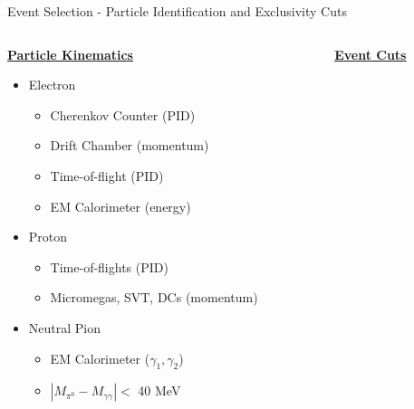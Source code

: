 \documentclass[aspectratio=169]{beamer}
\begin{document}
\begin{frame}{Event Selection - Particle Identification and Exclusivity Cuts}

        
        \begin{columns}[c]
           \begin{column}{0.35\textwidth}
            \centering \textbf{\underline{Particle Kinematics}}
                \begin{itemize}
                    \item Electron
                        \begin{itemize}
                            \item Cherenkov Counter (PID)
                            \item Drift Chamber (momentum)
                            \item Time-of-flight (PID)
                            \item EM Calorimeter (energy)
                        \end{itemize}
                    \item Proton
                        \begin{itemize}
                            \item Time-of-flights (PID)
                            \item Micromegas, SVT, DCs (momentum)
                        \end{itemize}
                    \item Neutral Pion
                        \begin{itemize}
                            \item EM Calorimeter ($\gamma_1, \gamma_2$)
                            \item $ |M_{\pi^0} - M_{\gamma\gamma}| <$ 40 MeV
                        \end{itemize}
                \end{itemize}
                \end{column}
            \vrule{}
            \begin{column}{0.65\textwidth}
            
            \centering  \textbf{\underline{Event Cuts}}
                    \begin{columns}[t, onlytextwidth]
                

\end{columns}
\end{column}
\end{columns}
\end{frame}
\end{document}
